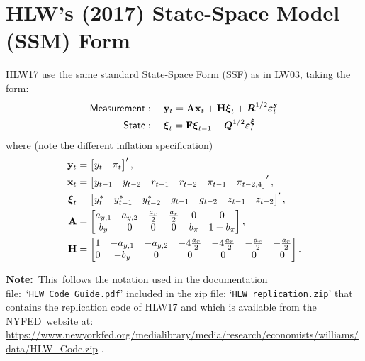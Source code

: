 \documentclass[a4paper,12pt]{article}
\begin{document}
\section{HLW's (2017) State-Space Model (SSM) Form}

HLW17 use the same standard State-Space Form (SSF) as in LW03, taking the
form:%
\begin{align*}
\mathsf{Measurement}& :\quad \mathbf{y}_{t}=\mathbf{Ax}_{t}+\mathbf{H}%
\boldsymbol{\xi }_{t}+\boldsymbol{R}^{1/2}\boldsymbol{\varepsilon }_{t}^{%
\mathbf{y}} \\
\mathsf{State}& :\quad \boldsymbol{\xi }_{t}=\mathbf{F}\boldsymbol{\xi }%
_{t-1}+\boldsymbol{Q}^{1/2}\boldsymbol{\varepsilon }_{t}^{\boldsymbol{\xi }}
\end{align*}%
where (note the different inflation specification)%
\begin{align*}
\mathbf{y}_{t}& =%
\begin{bmatrix}
y_{t} & \pi _{t}%
\end{bmatrix}%
^{\prime }, \\
\mathbf{x}_{t}& =%
\begin{bmatrix}
y_{t-1} & y_{t-2} & r_{t-1} & r_{t-2} & \pi _{t-1} & \pi _{t-2,4}%
\end{bmatrix}%
^{\prime }, \\
\boldsymbol{\xi }_{t}& =%
\begin{bmatrix}
y_{t}^{\ast } & y_{t-1}^{\ast } & y_{t-2}^{\ast } & g_{t-1} & g_{t-2} &
z_{t-1} & z_{t-2}%
\end{bmatrix}%
^{\prime }, \\
\mathbf{A}& =%
\begin{bmatrix}
a_{y,1} & a_{y,2} & \frac{a_{r}}{2} & \frac{a_{r}}{2} & 0 & 0 \\
b_{y} & 0 & 0 & 0 & b_{\pi } & 1-b_{\pi }%
\end{bmatrix}%
, \\
\mathbf{H}& =%
\begin{bmatrix}
1 & -a_{y,1} & -a_{y,2} & -4\frac{a_{r}}{2} & -4\frac{a_{r}}{2} & -\frac{%
a_{r}}{2} & -\frac{a_{r}}{2} \\
0 & -b_{y} & 0 & 0 & 0 & 0 & 0%
\end{bmatrix}%
.
\end{align*}

\noindent \textbf{Note:}\ This\ follows the notation used in the
documentation file:\ `\texttt{HLW\_Code\_Guide.pdf}' included in the zip
file: `\texttt{HLW\_replication.zip}' that contains the replication code of
HLW17 and which is available from the NYFED\ website at: %
\url{https://www.newyorkfed.org/medialibrary/media/research/economists/williams/data/HLW_Code.zip}%
.
\end{document}
